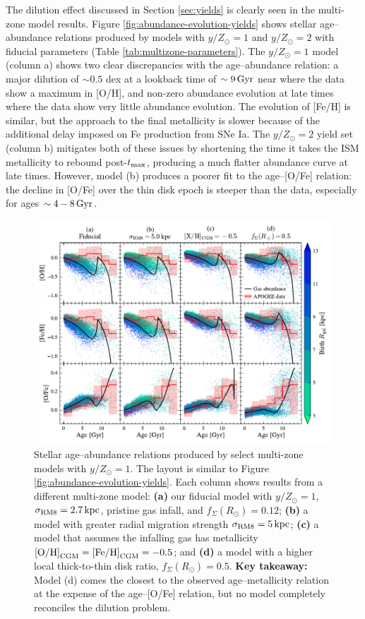 \documentclass[twocolumn,twocolappendix,linenumbers]{aastex631}
\newcommand{\mathOH}{{\rm [O/H]}}
\newcommand{\mathFeH}{{\rm [Fe/H]}}
\newcommand{\yZ}[1]{$y/Z_\odot=#1$}
\begin{document}
The dilution effect discussed in Section \ref{sec:yields} is clearly seen in the multi-zone model results. Figure \ref{fig:abundance-evolution-yields} shows stellar age--abundance relations produced by models with \yZ{1} and \yZ{2} with fiducial parameters (Table \ref{tab:multizone-parameters}). The \yZ{1} model (column a) shows two clear discrepancies with the \citet{leung_variational_2023} age--abundance relation: a major dilution of $\sim0.5$ dex at a lookback time of $\sim9\,{\rm Gyr}$ near where the data show a maximum in [O/H], and non-zero abundance evolution at late times where the data show very little abundance evolution. The evolution of [Fe/H] is similar, but the approach to the final metallicity is slower because of the additional delay imposed on Fe production from SNe Ia. The \yZ{2} yield set (column b) mitigates both of these issues by shortening the time it takes the ISM metallicity to rebound post-$t_{\rm max}$, producing a much flatter abundance curve at late times. However, model (b) produces a poorer fit to the age--[O/Fe] relation: the decline in [O/Fe] over the thin disk epoch is steeper than the data, especially for ages $\sim4-8\,{\rm Gyr}$.

\begin{figure}
    \centering
    \includegraphics{figures/abundance_evolution_params.pdf}
    \caption{Stellar age--abundance relations produced by select multi-zone models with \yZ{1}. The layout is similar to Figure \ref{fig:abundance-evolution-yields}. Each column shows results from a different multi-zone model: {\bf (a)} our fiducial model with $y/Z_\odot=1$, $\sigma_{\rm RM8}=2.7\,{\rm kpc}$, pristine gas infall, and $f_\Sigma(R_\odot)=0.12$; {\bf (b)} a model with greater radial migration strength $\sigma_{\rm RM8}=5\,{\rm kpc}$; {\bf (c)} a model that assumes the infalling gas has metallicity $\mathOH_{\rm CGM}=\mathFeH_{\rm CGM}=-0.5$; and {\bf (d)} a model with a higher local thick-to-thin disk ratio, $f_\Sigma(R_\odot)=0.5$. {\bf Key takeaway:} Model (d) comes the closest to the observed age--metallicity relation at the expense of the age--[O/Fe] relation, but no model completely reconciles the dilution problem.}
    \label{fig:abundance-evolution-params}
\end{figure}
\end{document}
